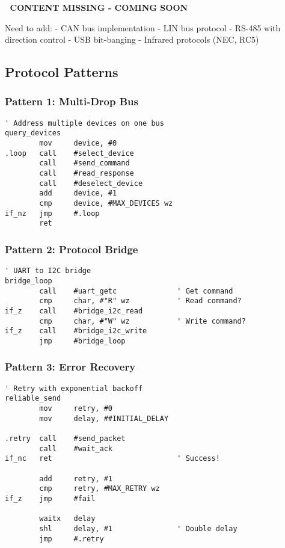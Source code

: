\documentclass[11pt]{book}
\begin{document}
\begin{missing}
🚧 \textbf{CONTENT MISSING - COMING SOON}

Need to add:
- CAN bus implementation
- LIN bus protocol
- RS-485 with direction control
- USB bit-banging
- Infrared protocols (NEC, RC5)
\end{missing}

\hypertarget{protocol-patterns}{%
\subsection{Protocol Patterns}\label{protocol-patterns}}

\hypertarget{pattern-1-multi-drop-bus}{%
\subsubsection{Pattern 1: Multi-Drop
Bus}\label{pattern-1-multi-drop-bus}}

\begin{lstlisting}
' Address multiple devices on one bus
query_devices
        mov     device, #0
.loop   call    #select_device
        call    #send_command
        call    #read_response
        call    #deselect_device
        add     device, #1
        cmp     device, #MAX_DEVICES wz
if_nz   jmp     #.loop
        ret
\end{lstlisting}

\hypertarget{pattern-2-protocol-bridge}{%
\subsubsection{Pattern 2: Protocol
Bridge}\label{pattern-2-protocol-bridge}}

\begin{lstlisting}
' UART to I2C bridge
bridge_loop
        call    #uart_getc              ' Get command
        cmp     char, #"R" wz           ' Read command?
if_z    call    #bridge_i2c_read
        cmp     char, #"W" wz           ' Write command?
if_z    call    #bridge_i2c_write
        jmp     #bridge_loop
\end{lstlisting}

\hypertarget{pattern-3-error-recovery}{%
\subsubsection{Pattern 3: Error
Recovery}\label{pattern-3-error-recovery}}

\begin{lstlisting}
' Retry with exponential backoff
reliable_send
        mov     retry, #0
        mov     delay, ##INITIAL_DELAY
        
.retry  call    #send_packet
        call    #wait_ack
if_nc   ret                             ' Success!
        
        add     retry, #1
        cmp     retry, #MAX_RETRY wz
if_z    jmp     #fail
        
        waitx   delay
        shl     delay, #1               ' Double delay
        jmp     #.retry
\end{lstlisting}
\end{document}
